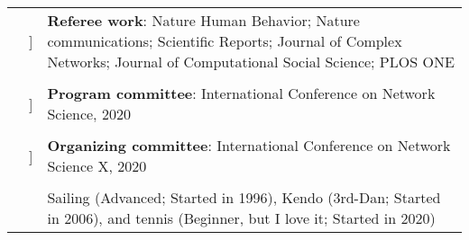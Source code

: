 \documentclass[letterpaper, 11pt]{article}
\newcounter{papercount}
\newcounter{papertype}
\newcommand{\changepapertype}{\setcounter{papercount}{0}\stepcounter{papertype}}
\newcommand{\paperitem}{%
\stepcounter{papercount}%
{\color{OliveGreen}{[\Alph{papertype}\thepapercount}]}
}
\begin{document}
\begin{longtable}{p{1.3in}p{2em}p{5.5in}}
    \changepapertype
    \multirow{2}{1in}{{\color{OliveGreen}{SERVICE}}}
                                                    &\paperitem & \textbf{Referee work}: Nature Human Behavior; Nature communications; Scientific Reports; Journal of Complex Networks; Journal of Computational Social Science; PLOS ONE \\
                                                    && \\
                                                    &\paperitem & \textbf{Program committee}: International Conference on Network Science, 2020 \\
                                                    && \\
                                                    &\paperitem & \textbf{Organizing committee}: International Conference on Network Science X, 2020 \\
                                                    & & \\

    \nohyphens{\color{OliveGreen}{OTHER INTERESTS}} & &\hspace{-2em} Sailing (Advanced; Started in 1996), Kendo (3rd-Dan; Started in 2006), and tennis (Beginner, but I love it; Started in 2020)\\

\end{longtable}
\end{document}

